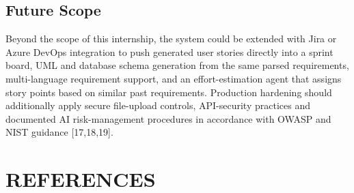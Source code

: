 \documentclass[12pt,a4paper,openany]{report}
\begin{document}
\section{Future Scope}
Beyond the scope of this internship, the system could be extended with Jira
or Azure DevOps integration to push generated user stories directly into a
sprint board, UML and database schema generation from the same parsed
requirements, multi-language requirement support, and an effort-estimation
agent that assigns story points based on similar past requirements.
Production hardening should additionally apply secure file-upload controls,
API-security practices and documented AI risk-management procedures in
accordance with OWASP and NIST guidance [17,18,19].

\chapter*{REFERENCES}
\end{document}
